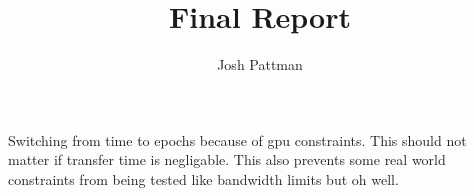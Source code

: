 \documentclass[12pt,a4paper]{report}
\author{Josh Pattman}
\title{Final Report}
\begin{document}
	\maketitle
	
	
	
	
	
	Switching from time to epochs because of gpu constraints. This should not matter if transfer time is negligable. This also prevents some real world constraints from being tested like bandwidth limits but oh well.
\end{document}

